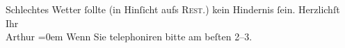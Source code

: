 \begin{ledgroupsized}[t]{13cm}
                    Schlechtes Wetter ſollte (in Hinſicht aufs \textsc{Rest.}) kein
                    Hindernis ſein.\pend
           \pstart
           Herzlichſt{\\[\baselineskip]}Ihr{\\[\baselineskip]}\spacefill\mbox{Arthur}\pend
           \leftskip=0em{}\pstart
           \noindent{}{\pb}Wenn Sie telephoniren bitte am beſten
                        2–3.\pend
           \endnumbering{}\end{ledgroupsized}  \newcommand{\dateiname}{L01306}\newcommand{\titel}{Arthur Schnitzler an Richard Beer-Hofmann, 6. 8. 1903}\newcommand{\editorInnen}{Martin Anton Müller und Gerd-Hermann Susen}
      